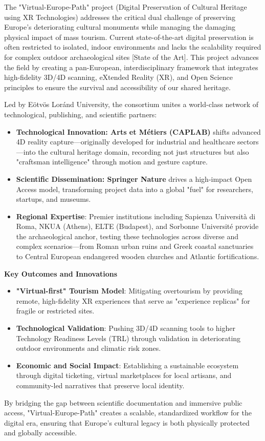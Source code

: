 The "Virtual-Europe-Path" project (Digital Preservation of Cultural Heritage using XR Technologies) addresses the critical dual challenge of preserving Europe's deteriorating cultural monuments while managing the damaging physical impact of mass tourism. Current state-of-the-art digital preservation is often restricted to isolated, indoor environments and lacks the scalability required for complex outdoor archaeological sites [State of the Art]. This project advances the field by creating a pan-European, interdisciplinary framework that integrates high-fidelity 3D/4D scanning, eXtended Reality (XR), and Open Science principles to ensure the survival and accessibility of our shared heritage.

Led by Eötvös Loránd University, the consortium unites a world-class network of technological, publishing, and scientific partners:
\begin{itemize}
    \item \textbf{Technological Innovation: Arts et Métiers (CAPLAB)} shifts advanced 4D reality capture—originally developed for industrial and healthcare sectors—into the cultural heritage domain, recording not just structures but also "craftsman intelligence" through motion and gesture capture.
    \item \textbf{Scientific Dissemination: Springer Nature} drives a high-impact Open Access model, transforming project data into a global "fuel" for researchers, startups, and museums.
    \item \textbf{Regional Expertise}: Premier institutions including Sapienza Università di Roma, NKUA (Athens), ELTE (Budapest), and Sorbonne Université provide the archaeological anchor, testing these technologies across diverse and complex scenarios—from Roman urban ruins and Greek coastal sanctuaries to Central European endangered wooden churches and Atlantic fortifications.
\end{itemize}

\textbf{Key Outcomes and Innovations}
\begin{itemize}
    \item \textbf{"Virtual-first" Tourism Model}: Mitigating overtourism by providing remote, high-fidelity XR experiences that serve as "experience replicas" for fragile or restricted sites.
    \item \textbf{Technological Validation}: Pushing 3D/4D scanning tools to higher Technology Readiness Levels (TRL) through validation in deteriorating outdoor environments and climatic risk zones.
    \item \textbf{Economic and Social Impact}: Establishing a sustainable ecosystem through digital ticketing, virtual marketplaces for local artisans, and community-led narratives that preserve local identity.
\end{itemize}

By bridging the gap between scientific documentation and immersive public access, "Virtual-Europe-Path" creates a scalable, standardized workflow for the digital era, ensuring that Europe's cultural legacy is both physically protected and globally accessible.